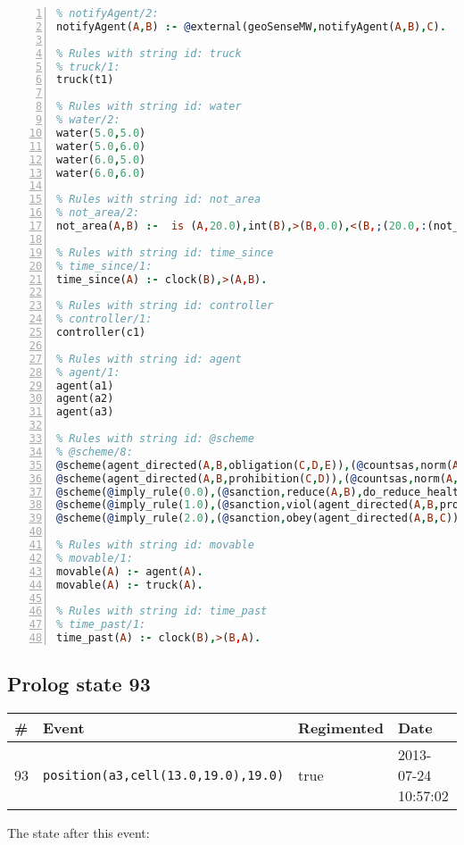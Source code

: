 \documentclass[11pt]{article}\usepackage[utf8]{inputenc}\usepackage{geometry}
\begin{document}
\begin{lstlisting}[language=Prolog, numbers=left]
% Rules with string id: notifyAgent
% notifyAgent/2:
notifyAgent(A,B) :- @external(geoSenseMW,notifyAgent(A,B),C).

% Rules with string id: truck
% truck/1:
truck(t1)

% Rules with string id: water
% water/2:
water(5.0,5.0)
water(5.0,6.0)
water(6.0,5.0)
water(6.0,6.0)

% Rules with string id: not_area
% not_area/2:
not_area(A,B) :-  is (A,20.0),int(B),>(B,0.0),<(B,;(20.0,:(not_area(A,B), is (-(B),20.0)))),int(A),>(A,0.0),<(A,;(20.0,:(area(A,B),-(int(A))))),int(B),>(A,0.0),>(B,0.0),<(A,21.0),<(B,21.0).

% Rules with string id: time_since
% time_since/1:
time_since(A) :- clock(B),>(A,B).

% Rules with string id: controller
% controller/1:
controller(c1)

% Rules with string id: agent
% agent/1:
agent(a1)
agent(a2)
agent(a3)

% Rules with string id: @scheme
% @scheme/8:
@scheme(agent_directed(A,B,obligation(C,D,E)),(@countsas,norm(A,B,F,obligation(C,D,E)),F),false,(listTrue(C)),(time_past(D)),false,[plus(viol(agent_directed(A,B,obligation(C,D,E))))|[]],[plus(obey(agent_directed(A,B,obligation(C,D,E))))|[]])
@scheme(agent_directed(A,B,prohibition(C,D)),(@countsas,norm(A,B,E,prohibition(C,D)),E),(listTrue(C)),false,(false),false,[plus(viol(agent_directed(A,B,prohibition(C,D))))|[]],[plus(obey(agent_directed(A,B,prohibition(C,D))))|[]])
@scheme(@imply_rule(0.0),(@sanction,reduce(A,B),do_reduce_health(A,B),notifyAgent(A,changed(status))),true,false,false,false,[min(reduce(A,B))|[]],[])
@scheme(@imply_rule(1.0),(@sanction,viol(agent_directed(A,B,prohibition(C,D))),do_sanction(D)),true,false,false,false,[min(viol(agent_directed(A,B,prohibition(C,D))))|[]],[])
@scheme(@imply_rule(2.0),(@sanction,obey(agent_directed(A,B,C))),true,false,false,false,[min(obey(agent_directed(A,B,C)))|[]],[])

% Rules with string id: movable
% movable/1:
movable(A) :- agent(A).
movable(A) :- truck(A).

% Rules with string id: time_past
% time_past/1:
time_past(A) :- clock(B),>(B,A).

\end{lstlisting}
\clearpage 
\subsection{Prolog state 93}
\begin{table}[ht]
\centering 
\begin{tabular}{l l l l} 
\textbf{\#} & \textbf{Event} & \textbf{Regimented} & \textbf{Date} \\ [0.5ex] 
\hline
93&\texttt{position(a3,cell(13.0,19.0),19.0)}&true&2013-07-24 10:57:02\\ [1ex] \hline\end{tabular}
\end{table}
The state after this event:
\end{document}
